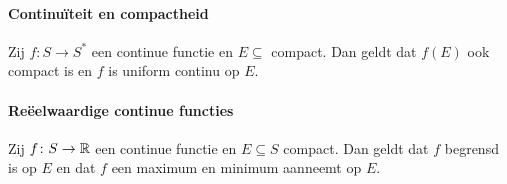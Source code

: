 \paragraph{Continuïteit en compactheid} Zij \(f\colon S\to S^{*}\) een continue functie en \(E\subseteq\) compact. Dan geldt dat \(f(E)\) ook compact is en \(f\) is uniform continu op \(E\).

\paragraph{Reëelwaardige continue functies} Zij \(f\colon S\to\mathbb{R}\) een continue functie en \(E\subseteq S\) compact. Dan geldt dat \(f\) begrensd is op \(E\) en dat \(f\) een maximum en minimum aanneemt op \(E\).